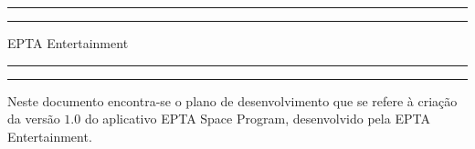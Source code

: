  


\begin{titlepage} %

	\AddToShipoutPicture*{\BackgroundPic}
	\begin{minipage}[h!]{0.36\textwidth}
        \phantom{..}
    \end{minipage} 
    \begin{minipage}[h!]{0.6\textwidth}
	
		\centering %
	
		\scshape %
	
	
		\rule{\textwidth}{1.6pt}\vspace*{-\baselineskip}\vspace*{2pt} %
		\rule{\textwidth}{0.4pt} %
	
		\vspace{0.75\baselineskip} %
	
		{\LARGE EPTA Entertainment\\} %
	
		\vspace{0.75\baselineskip} %
	
		\rule{\textwidth}{0.4pt}\vspace*{-\baselineskip}\vspace{3.2pt} %
		\rule{\textwidth}{1.6pt} %
	
		\vspace{2\baselineskip} %
	
	
		Neste documento encontra-se o plano de desenvolvimento que se refere à criação da versão $1.0$ do aplicativo EPTA Space Program, desenvolvido pela EPTA Entertainment.%
	

\end{minipage}
\end{titlepage}
